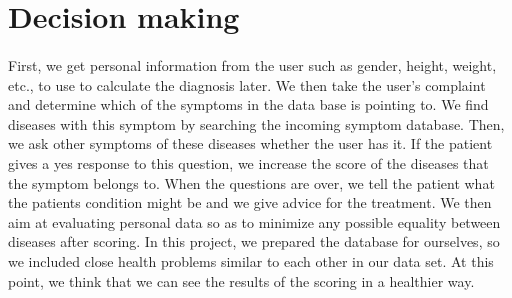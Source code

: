 \section{Decision making}

\paragraph{}
First,	we	get	personal	information	from	the	user	such	as	gender,	height,	weight,	etc.,	to	use	to	calculate	the	diagnosis	later.	We	then	take	the	user's	complaint	and	determine	which	of	the	symptoms	in	the	data	base	is	pointing	to.	We	find	diseases	with	this	symptom	by	searching	the	incoming	symptom	database.	Then,	we	ask	other	symptoms	of	these	diseases	whether	the	user	has	it.	If	the	patient	gives a	yes	response to	this	question,	we	increase the score	of the	diseases	that	the	symptom	belongs	to.	When	the	questions	are	over,	we	tell	the	patient	what	the	patients condition might be	and	we	give	advice	for	the	treatment.	We	then	aim	at	evaluating	personal	data	so	as	to	minimize	any	possible	equality	between	diseases	after	scoring.	In	this	project,	we	prepared	the	database	for	ourselves,	so	we	included	close	health	problems	similar	to	each	other	in	our	data	set.	At	this	point,	we	think	that	we	can	see	the	results	of	the	scoring	in	a	healthier	way.	